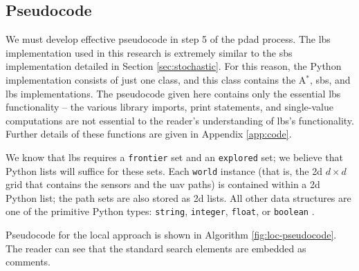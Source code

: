 \documentclass[../main.tex]{subfiles}
\begin{document}
\subsection{Pseudocode}\label{loc:pseudocode}

We must develop effective pseudocode in step 5 of the \ac{pdad} process. The \ac{lbs} implementation used in this research is extremely similar to the \ac{sbs} implementation detailed in Section \ref{sec:stochastic}. For this reason, the Python implementation consists of just one class, and this class contains the A$^*$, \ac{sbs}, and \ac{lbs} implementations. The pseudocode given here contains only the essential \ac{lbs} functionality -- the various library imports, print statements, and single-value computations are not essential to the reader's understanding of \ac{lbs}'s functionality. Further details of these functions are given in Appendix \ref{app:code}. 

We know that \acl{lbs} requires a \texttt{frontier} set and an \texttt{explored} set; we believe that Python lists will suffice for these sets. Each \texttt{world} instance (that is, the \ac{2d} $d\times d$ grid that contains the \probs sensors and the \ac{uav} paths) is contained within a \ac{2d} Python list; the path sets are also stored as \ac{2d} lists. All other data structures are one of the primitive Python types: \texttt{string}, \texttt{integer}, \texttt{float}, or \texttt{boolean} \cite{python:primitives}.

Pseudocode for the local approach is shown in Algorithm \ref{fig:loc-pseudocode}. The reader can see that the standard search elements are embedded as comments.
\end{document}
